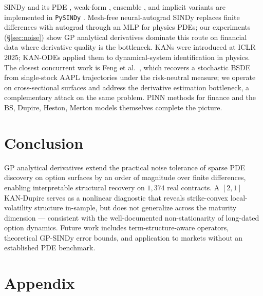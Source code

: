 \documentclass[10pt]{article}
\begin{document}
SINDy \citep{brunton2016sindy} and its PDE \citep{rudy2017pde}, weak-form \citep{messenger2021weak}, ensemble \citep{fasel2022ensemble}, and implicit \citep{kaheman2020sindypi} variants are implemented in \texttt{PySINDy} \citep{desilva2020pysindy}. Mesh-free neural-autograd SINDy \citep{gao2025meshfree} replaces finite differences with autograd through an MLP for physics PDEs; our experiments (\S\ref{sec:noise}) show GP analytical derivatives dominate this route on financial data where derivative quality is the bottleneck. KANs \citep{liu2025kan} were introduced at ICLR 2025; KAN-ODEs \citep{koenig2024kanodes} applied them to dynamical-system identification in physics. The closest concurrent work is Feng et al.\ \citep{feng2025feynmankac}, which recovers a stochastic BSDE from single-stock AAPL trajectories under the risk-neutral measure; we operate on cross-sectional surfaces and address the derivative estimation bottleneck, a complementary attack on the same problem. PINN methods for finance \citep{raissi2019pinn,sirignano2018dgm,dhiman2023option} and the BS, Dupire, Heston, Merton models themselves \citep{blackscholes1973,dupire1994pricing,heston1993closed,merton1976option} complete the picture.

\section{Conclusion}

GP analytical derivatives extend the practical noise tolerance of sparse PDE discovery on option surfaces by an order of magnitude over finite differences, enabling interpretable structural recovery on $1{,}374$ real contracts. A $[2,1]$ KAN-Dupire serves as a nonlinear diagnostic that reveals strike-convex local-volatility structure in-sample, but does not generalize across the maturity dimension --- consistent with the well-documented non-stationarity of long-dated option dynamics. Future work includes term-structure-aware operators, theoretical GP-SINDy error bounds, and application to markets without an established PDE benchmark.




\appendix
\section*{Appendix}
\end{document}
